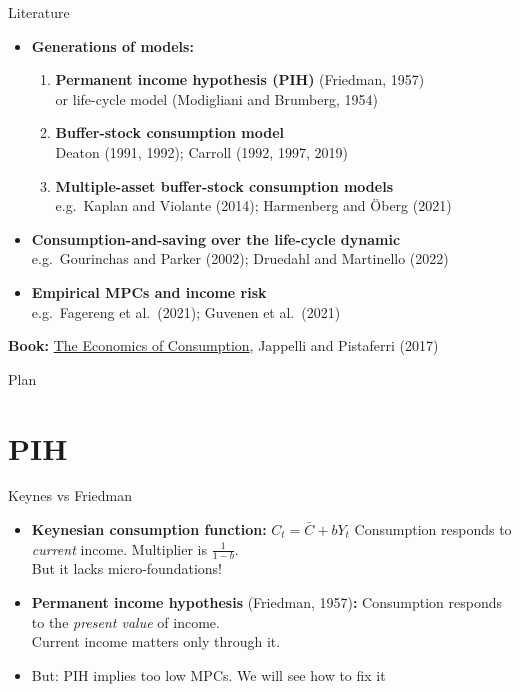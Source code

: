 \documentclass[
  10pt,
  ignorenonframetext,
  aspectratio=43,
  english,
  handout]{beamer}
\providecommand{\tightlist}{%
  \setlength{\itemsep}{0pt}\setlength{\parskip}{0pt}}
\begin{document}
\begin{frame}{Literature}
\protect{}\label{literature}
\begin{itemize}
\tightlist
\item
  \textbf{Generations of models:}

  \begin{enumerate}
  \tightlist
  \item
    \textbf{Permanent income hypothesis (PIH)} (Friedman, 1957)\\
    or life-cycle model (Modigliani and Brumberg, 1954)
  \item
    \textbf{Buffer-stock consumption model}\\
    Deaton (1991, 1992); Carroll (1992, 1997, 2019)
  \item
    \textbf{Multiple-asset buffer-stock consumption models}\\
    e.g.~Kaplan and Violante (2014); Harmenberg and Öberg (2021)
  \end{enumerate}
\item
  \textbf{Consumption-and-saving over the life-cycle dynamic}\\
  e.g.~Gourinchas and Parker (2002); Druedahl and Martinello (2022)
\item
  \textbf{Empirical MPCs and income risk}\\
  e.g.~Fagereng et al.~(2021); Guvenen et al.~(2021)
\end{itemize}

\textbf{Book:}
\href{https://global.oup.com/academic/product/the-economics-of-consumption-9780199383153?cc=dk&lang=en&}{The
Economics of Consumption}, Jappelli and Pistaferri (2017)
\end{frame}

\begin{frame}{Plan}
\protect{}\label{plan}
\tableofcontents[]
\end{frame}

\section{PIH}\label{pih}

\begin{frame}{Keynes vs Friedman}
\protect{}\label{keynes-vs-friedman}
\begin{itemize}
\tightlist
\item
  \textbf{Keynesian consumption function:} \(C_{t}=\bar{C}+bY_{t}\)
  Consumption responds to \emph{current} income. Multiplier is
  \(\frac{1}{1-b}\).\\
  But it lacks micro-foundations!
\item
  \textbf{Permanent income hypothesis} (Friedman, 1957)\textbf{:}
  Consumption responds to the \emph{present value} of income.\\
  Current income matters only through it.
\item
  But: PIH implies too low MPCs. We will see how to fix it
\end{itemize}
\end{frame}
\end{document}
